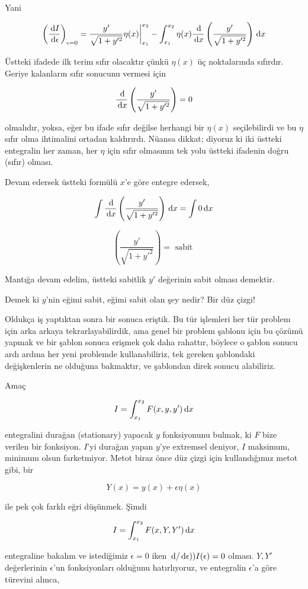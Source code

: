 \documentclass[12pt,fleqn]{article}\usepackage{../../common}
\begin{document}
Yani

$$
\left( \frac{\,\mathrm{d} I}{\,\mathrm{d} \epsilon} \right)_{\epsilon = 0} =
\frac{y'}{\sqrt{1+y'^2}} \eta(x) \bigg\vert_{x_1}^{x_2} -
\int_{x_1}^{x_2} \eta(x) \frac{\,\mathrm{d}}{\,\mathrm{d} x} \left( \frac{y'}{\sqrt{1+y'^2}} \right)
\,\mathrm{d} x
$$

Üstteki ifadede ilk terim sıfır olacaktır çünkü $\eta(x)$ üç noktalarında
sıfırdır. Geriye kalanların sıfır sonucunu vermesi için 

$$
\frac{\,\mathrm{d}}{\,\mathrm{d} x} \left( \frac{y'}{\sqrt{1+y'^2}} \right) = 0
$$

olmalıdır, yoksa, eğer bu ifade sıfır değilse herhangi bir $\eta(x)$
seçilebilirdi ve bu $\eta$ sıfır olma ihtimalini ortadan kaldırırdı. Nüansa
dikkat; diyoruz ki iki üstteki entegralin her zaman, her $\eta$ için sıfır
olmasının tek yolu üstteki ifadenin doğru (sıfır) olması.

Devam edersek üstteki formülü $x$'e göre entegre edersek, 

$$
\int \frac{\,\mathrm{d}}{\,\mathrm{d} x} \left( \frac{y'}{\sqrt{1+y'^2}} \right) \,\mathrm{d} x = \int
0 \,\mathrm{d} x 
$$

$$
\left( \frac{y'}{\sqrt{1+y'^2}} \right) = \textrm{ sabit }
$$

Mantığa devam edelim, üstteki sabitlik $y'$ değerinin sabit olması
demektir. 

Demek ki $y$'nin eğimi sabit, eğimi sabit olan şey nedir? Bir düz çizgi! 

Oldukça iş yaptıktan sonra bir sonuca eriştik. Bu tür işlemleri her tür
problem için arka arkaya tekrarlayabilirdik, ama genel bir problem şablonu
için bu çözümü yapmak ve bir şablon sonuca erişmek çok daha rahattır,
böylece o şablon sonucu ardı ardına her yeni problemde kullanabiliriz, tek
gereken şablondaki değişkenlerin ne olduğuna bakmaktır, ve şablondan direk
sonucu alabiliriz.

Amaç 

$$
I = \int_{x_1}^{x_2} F(x,y,y') \,\mathrm{d} x
$$

entegralini durağan (stationary) yapacak $y$ fonksiyonunu bulmak, ki $F$
bize verilen bir fonksiyon. $I$'yi durağan yapan $y$'ye extremsel deniyor,
$I$ maksimum, minimum olsun farketmiyor. Metot biraz önce düz çizgi için
kullandığımız metot gibi, bir

$$
Y(x) = y(x) + \epsilon \eta(x)
$$

ile pek çok farklı eğri düşünmek. Şimdi 

$$
I = \int_{x_1}^{x_2} F(x,Y,Y') \,\mathrm{d} x
$$

entegraline bakalım ve istediğimiz $\epsilon = 0$ iken
$\,\mathrm{d} / \,\mathrm{d} \epsilon) ) I(\epsilon) = 0$ olması. $Y,Y'$ değerlerinin
$\epsilon$'un fonksiyonları olduğunu hatırlıyoruz, ve entegralin
$\epsilon$'a göre türevini alınca, 
\end{document}
